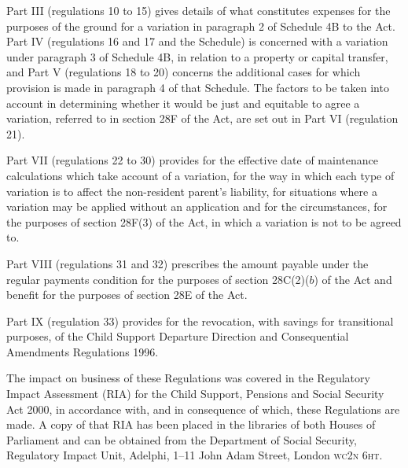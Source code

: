\documentclass[12pt,a4paper]{article}
\begin{document}
Part III (regulations 10 to 15) gives details of what constitutes expenses for the purposes of the ground for a variation in paragraph 2 of Schedule 4B to the Act. Part IV (regulations 16 and 17 and the Schedule) is concerned with a variation under paragraph 3 of Schedule 4B, in relation to a property or capital transfer, and Part V (regulations 18 to 20) concerns the additional cases for which provision is made in paragraph 4 of that Schedule. The factors to be taken into account in determining whether it would be just and equitable to agree a variation, referred to in section 28F of the Act, are set out in Part VI (regulation 21).

Part VII (regulations 22 to 30) provides for the effective date of maintenance calculations which take account of a variation, for the way in which each type of variation is to affect the non-resident parent’s liability, for situations where a variation may be applied without an application and for the circumstances, for the purposes of section 28F(3) of the Act, in which a variation is not to be agreed to.

Part VIII (regulations 31 and 32) prescribes the amount payable under the regular payments condition for the purposes of section 28C(2)($b$)  of the Act and benefit for the purposes of section 28E of the Act.

Part IX (regulation 33) provides for the revocation, with savings for transitional purposes, of the Child Support Departure Direction and Consequential Amendments Regulations 1996.

The impact on business of these Regulations was covered in the Regulatory Impact Assessment (RIA) for the Child Support, Pensions and Social Security Act 2000, in accordance with, and in consequence of which, these Regulations are made. A copy of that RIA has been placed in the libraries of both Houses of Parliament and can be obtained from the Department of Social Security, Regulatory Impact Unit, Adelphi, 1--11 John Adam Street, London \textsc{\lowercase{WC2N 6HT}}. 
\end{document}
